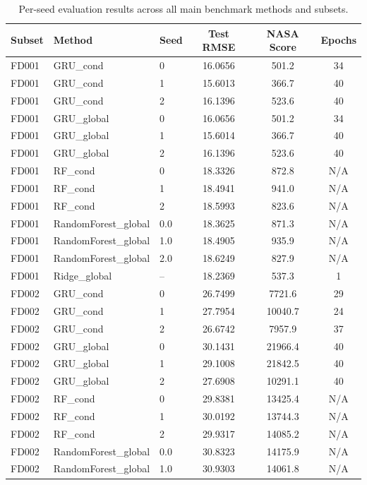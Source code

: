 \begin{table}[t]
\centering
\caption{Per-seed evaluation results across all main benchmark methods and subsets.}
\label{tab:per_seed_results}
\small
\begin{tabular}{lllccc}
\toprule
\textbf{Subset} & \textbf{Method} & \textbf{Seed} & \textbf{Test RMSE} & \textbf{NASA Score} & \textbf{Epochs} \\
\midrule
FD001 & GRU\_cond & 0 & 16.0656 & 501.2 & 34 \\
FD001 & GRU\_cond & 1 & 15.6013 & 366.7 & 40 \\
FD001 & GRU\_cond & 2 & 16.1396 & 523.6 & 40 \\
FD001 & GRU\_global & 0 & 16.0656 & 501.2 & 34 \\
FD001 & GRU\_global & 1 & 15.6014 & 366.7 & 40 \\
FD001 & GRU\_global & 2 & 16.1396 & 523.6 & 40 \\
FD001 & RF\_cond & 0 & 18.3326 & 872.8 & N/A \\
FD001 & RF\_cond & 1 & 18.4941 & 941.0 & N/A \\
FD001 & RF\_cond & 2 & 18.5993 & 823.6 & N/A \\
FD001 & RandomForest\_global & 0.0 & 18.3625 & 871.3 & N/A \\
FD001 & RandomForest\_global & 1.0 & 18.4905 & 935.9 & N/A \\
FD001 & RandomForest\_global & 2.0 & 18.6249 & 827.9 & N/A \\
FD001 & Ridge\_global & -- & 18.2369 & 537.3 & 1 \\
\midrule
FD002 & GRU\_cond & 0 & 26.7499 & 7721.6 & 29 \\
FD002 & GRU\_cond & 1 & 27.7954 & 10040.7 & 24 \\
FD002 & GRU\_cond & 2 & 26.6742 & 7957.9 & 37 \\
FD002 & GRU\_global & 0 & 30.1431 & 21966.4 & 40 \\
FD002 & GRU\_global & 1 & 29.1008 & 21842.5 & 40 \\
FD002 & GRU\_global & 2 & 27.6908 & 10291.1 & 40 \\
FD002 & RF\_cond & 0 & 29.8381 & 13425.4 & N/A \\
FD002 & RF\_cond & 1 & 30.0192 & 13744.3 & N/A \\
FD002 & RF\_cond & 2 & 29.9317 & 14085.2 & N/A \\
FD002 & RandomForest\_global & 0.0 & 30.8323 & 14175.9 & N/A \\
FD002 & RandomForest\_global & 1.0 & 30.9303 & 14061.8 & N/A \\

\end{tabular}
\end{table}
